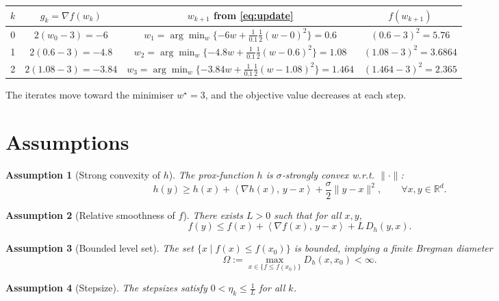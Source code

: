 \documentclass{article}
\newtheorem{assumption}{Assumption}
\newcommand{\inner}[2]{\left\langle #1,\,#2 \right\rangle}
\newcommand{\D}[2]{D_{h}(#1,#2)}
\newcommand{\grad}{\nabla}
\begin{document}
\begin{center}
\begin{tabular}{c|c|c|c}
$k$ & $g_k=\grad f(w_k)$ & $w_{k+1}$ from \eqref{eq:update} & $f(w_{k+1})$ \\ \hline
0 & $2(w_0-3)=-6$ & $w_1 = \arg\min_w\{-6w+\tfrac{1}{0.1}\tfrac12(w-0)^2\}=0.6$ & $(0.6-3)^2=5.76$\\
1 & $2(0.6-3)=-4.8$ & $w_2 = \arg\min_w\{-4.8w+\tfrac{1}{0.1}\tfrac12(w-0.6)^2\}=1.08$ & $(1.08-3)^2=3.6864$\\
2 & $2(1.08-3)=-3.84$ & $w_3 = \arg\min_w\{-3.84w+\tfrac{1}{0.1}\tfrac12(w-1.08)^2\}=1.464$ & $(1.464-3)^2=2.365$\\
\end{tabular}
\end{center}
The iterates move toward the minimiser $w^\star=3$, and the objective value decreases at each step.

\newpage

\section*{Assumptions}
\begin{assumption}[Strong convexity of $h$]
\label{assump:strong}
The prox‑function $h$ is $\sigma$‑strongly convex w.r.t. $\|\cdot\|$:
\[
h(y)\ge h(x)+\inner{\grad h(x)}{y-x}+\frac{\sigma}{2}\|y-x\|^{2},
\qquad\forall x,y\in\mathbb{R}^{d}.
\]
\end{assumption}

\begin{assumption}[Relative smoothness of $f$]
\label{assump:rel-smooth}
There exists $L>0$ such that for all $x,y$,
\[
f(y)\le f(x)+\inner{\grad f(x)}{y-x}+L\,\D{y}{x}.
\]
\end{assumption}

\begin{assumption}[Bounded level set]
\label{assump:bounded}
The set $\{x\mid f(x)\le f(x_0)\}$ is bounded, implying a finite Bregman diameter
\[
\Omega:=\max_{x\in\{f\le f(x_0)\}} \D{x}{x_0}<\infty .
\]
\end{assumption}

\begin{assumption}[Stepsize]
\label{assump:stepsize}
The stepsizes satisfy $0<\eta_k\le \frac{1}{L}$ for all $k$.
\end{assumption}
\end{document}
